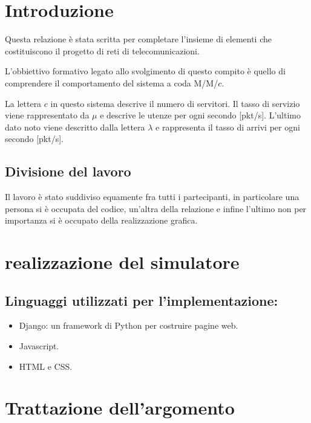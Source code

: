 \documentclass[12pt,a4paper]{article}
\begin{document}
\section{Introduzione}

    Questa relazione è stata scritta per completare l'insieme di elementi che costituiscono il progetto di reti di telecomunicazioni.
    
    L'obbiettivo formativo legato allo svolgimento di questo compito è quello di comprendere il comportamento del sistema a coda M/M/$c$.

    La lettera $c$ in questo sistema descrive il numero di servitori. Il tasso di servizio viene rappresentato da $\mu$ e descrive le utenze per ogni secondo [pkt/s]. L'ultimo dato noto viene descritto dalla lettera $\lambda$ e rappresenta il tasso di arrivi per ogni secondo [pkt/s].

\subsection{Divisione del lavoro}
    Il lavoro è stato suddiviso equamente fra tutti i partecipanti, in particolare una persona si è occupata del codice, un'altra della relazione e infine l'ultimo non per importanza si è occupato della realizzazione grafica.
\section{realizzazione del simulatore}
    \subsection{Linguaggi utilizzati per l'implementazione:}
    \begin{itemize}
        \item Django: un framework di Python per costruire pagine web.
        \item Javascript.
        \item HTML e CSS.
    \end{itemize}
\section{Trattazione dell'argomento}
\newpage
\end{document}
